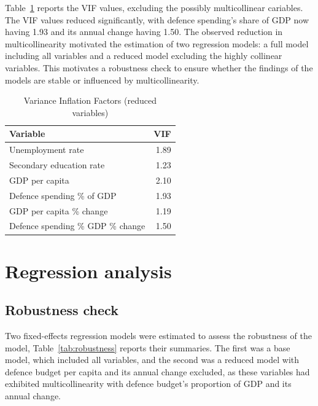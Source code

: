 Table~\ref{tab:multicollinearity_reduced} reports the VIF values, excluding the possibly multicollinear 
cariables.
The VIF values reduced significantly, with defence spending's share of GDP now having 
1.93 and its annual change having 1.50. The observed reduction in multicollinearity motivated the 
estimation of two regression models: a full model including all variables and a reduced model 
excluding the highly collinear variables. This motivates a robustness check to ensure whether 
the findings of the models are stable or influenced by multicollinearity.

\begin{table}[ht]
\caption{Variance Inflation Factors (reduced variables)}
\small
\centering
\begin{tabularx}{\textwidth}{l r}
\toprule
\textbf{Variable} & \textbf{VIF} \\
\midrule
Unemployment rate & 1.89 \\
Secondary education rate & 1.23 \\
GDP per capita & 2.10 \\
Defence spending \% of GDP & 1.93 \\
GDP per capita \% change & 1.19 \\
Defence spending \% GDP \% change & 1.50 \\
\bottomrule
\end{tabularx}
\label{tab:multicollinearity_reduced}
\end{table}

\section{Regression analysis}

\subsection{Robustness check}

Two fixed-effects regression models were estimated to assess the robustness of the model, 
Table~\ref{tab:robustness} reports their summaries. 
The first was a base model, 
which included all variables, and the second was a reduced model with defence budget 
per capita and its annual change excluded, as these variables had exhibited multicollinearity 
with defence budget's proportion of GDP and its annual change.

\renewcommand{\arraystretch}{1.3}

